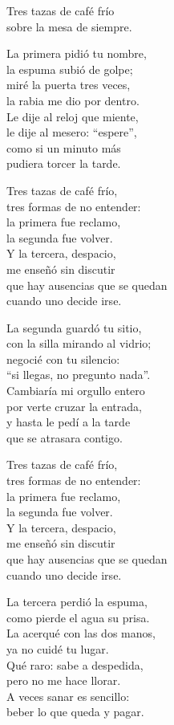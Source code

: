 \begin{lyrics}
Tres tazas de café frío\\
sobre la mesa de siempre.

La primera pidió tu nombre,\\
la espuma subió de golpe;\\
miré la puerta tres veces,\\
la rabia me dio por dentro.\\
Le dije al reloj que miente,\\
le dije al mesero: “espere”,\\
como si un minuto más\\
pudiera torcer la tarde.

Tres tazas de café frío,\\
tres formas de no entender:\\
la primera fue reclamo,\\
la segunda fue volver.\\
Y la tercera, despacio,\\
me enseñó sin discutir\\
que hay ausencias que se quedan\\
cuando uno decide irse.

La segunda guardó tu sitio,\\
con la silla mirando al vidrio;\\
negocié con tu silencio:\\
“si llegas, no pregunto nada”.\\
Cambiaría mi orgullo entero\\
por verte cruzar la entrada,\\
y hasta le pedí a la tarde\\
que se atrasara contigo.

Tres tazas de café frío,\\
tres formas de no entender:\\
la primera fue reclamo,\\
la segunda fue volver.\\
Y la tercera, despacio,\\
me enseñó sin discutir\\
que hay ausencias que se quedan\\
cuando uno decide irse.

La tercera perdió la espuma,\\
como pierde el agua su prisa.\\
La acerqué con las dos manos,\\
ya no cuidé tu lugar.\\
Qué raro: sabe a despedida,\\
pero no me hace llorar.\\
A veces sanar es sencillo:\\
beber lo que queda y pagar.


\end{lyrics}
